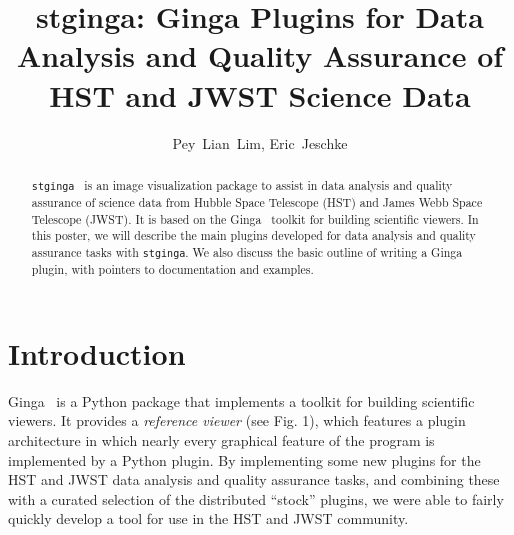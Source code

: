 \documentclass[11pt,twoside]{article}
\begin{document}
\title{stginga: Ginga Plugins for Data Analysis and Quality Assurance of
HST and JWST Science Data}

\author{Pey~Lian~Lim, Eric~Jeschke}


\begin{abstract}
{\tt stginga}~\citep*{stginga} is an image visualization package to assist
in data analysis and quality assurance of science data from Hubble Space
Telescope (HST) and James Webb Space Telescope (JWST).  It is based on the
Ginga~\citep*{ginga} toolkit for building scientific viewers.
In this poster, we will describe the main plugins developed for data
analysis and quality assurance tasks with {\tt stginga}.  We also discuss the
basic outline of writing a Ginga plugin, with pointers to documentation
and examples.
\end{abstract}

\section{Introduction}
Ginga~\citep*{Jeschke15A} is a Python package that
implements a toolkit for building scientific viewers.  It provides
a \emph{reference viewer} (see Fig. 1), which features
a plugin architecture in which nearly every graphical feature of the
program is implemented by a Python plugin.
By implementing some new plugins for the HST and JWST data analysis and
quality assurance tasks, and combining these with a curated selection of
the distributed ``stock'' plugins, we were able to fairly quickly
develop a tool for use in the HST and JWST community.
\end{document}
